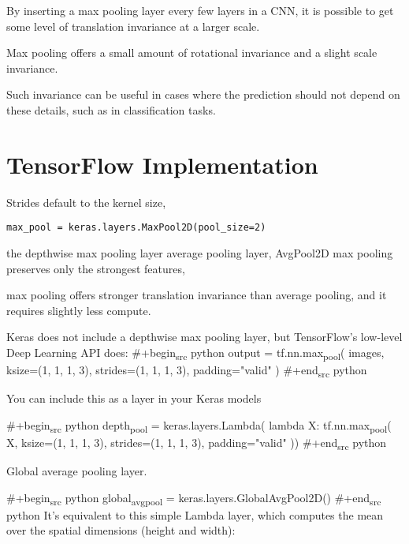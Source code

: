 \documentclass[11pt]{article}
\begin{document}
By inserting a max pooling layer every few layers in a CNN, 
it is possible to get some level of translation invariance at a larger scale. 

Max pooling offers a small amount of rotational invariance and a
slight scale invariance. 

Such invariance can be useful in cases where the prediction should not depend on
these details, such as in classification tasks.

\section{TensorFlow Implementation}
\label{sec:orgc26e6da}
Strides default to the kernel size, 
\begin{verbatim}
max_pool = keras.layers.MaxPool2D(pool_size=2)
\end{verbatim}

the depthwise max pooling layer 
average pooling layer, AvgPool2D 
max pooling preserves only the strongest features, 

max pooling offers stronger
translation invariance than average pooling, and it requires slightly less
compute.

Keras does not include a depthwise max pooling layer, but TensorFlow’s
low-level Deep Learning API does: 
\#+begin\textsubscript{src}  python
output = tf.nn.max\textsubscript{pool}(
                        images,
                        ksize=(1, 1, 1, 3),
                        strides=(1, 1, 1, 3),
                        padding="valid"
)
\#+end\textsubscript{src}  python


You can include this as a layer in your Keras models

\#+begin\textsubscript{src}  python
depth\textsubscript{pool} = keras.layers.Lambda(
                  lambda X: tf.nn.max\textsubscript{pool}(
                                           X, 
                                           ksize=(1, 1, 1, 3), 
                                           strides=(1, 1, 1, 3),
                                           padding="valid"
))
\#+end\textsubscript{src}  python

Global average pooling layer. 

\#+begin\textsubscript{src}  python
global\textsubscript{avg}\textsubscript{pool} = keras.layers.GlobalAvgPool2D()
\#+end\textsubscript{src}  python
It’s equivalent to this simple Lambda layer, which computes the mean over
the spatial dimensions (height and width):
\end{document}
